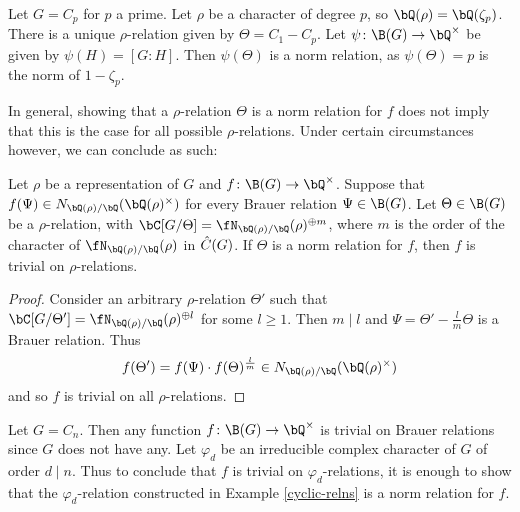 \begin{example}
    Let $G = C_p$ for $p$ a prime. Let $\rho$ be a character of degree $p$, so $\bQ(\rho) = \bQ(\zeta_p)$. There is a unique $\rho$-relation given by $\Theta = C_1 - C_p$. Let $\psi \colon \B(G) \to \bQ^{\times}$ be given by $\psi(H) = [G \colon H]$. Then $\psi(\Theta)$ is a norm relation, as $\psi(\Theta) = p$ is the norm of $1 - \zeta_p$.
\end{example}

In general, showing that a $\rho$-relation $\Theta$ is a norm relation for $f$ does not imply that this is the case for all possible $\rho$-relations. Under certain circumstances however, we can conclude as such:

\begin{prop}\label{min-to-all}
    Let $\rho$ be a representation of $G$ and $f \colon \B(G) \to \bQ^{\times}$. Suppose that $f(\Psi) \in \fieldnorm{\rho}$ for every Brauer relation $\Psi \in \B(G)$. 
    Let $\Theta \in \B(G)$ be a $\rho$-relation, with $\bC[G / \Theta] = \repnorm{\rho}^{\oplus m}$, where $m$ is the order of the character of $\repnorm{\rho}$ in $\hat{C}(G)$. 
    If $\Theta$ is a norm relation for $f$, then $f$ is trivial on $\rho$-relations. 
\end{prop}

\begin{proof}
    Consider an arbitrary $\rho$-relation $\Theta'$ such that $\bC[G / \Theta'] = \repnorm{\rho}^{\oplus l}$ for some $l \geq 1$. Then $m \mid l$ and $\Psi = \Theta' - \frac{l}{m}\Theta$ is a Brauer relation. Thus
    \[ f(\Theta') = f(\Psi)\cdot f(\Theta)^{\frac{l}{m}} \in \fieldnorm{\rho} \]
    and so $f$ is trivial on all $\rho$-relations.
\end{proof}

\begin{example}
    Let $G = C_n$. Then any function $f \colon \B(G) \to \bQ^{\times}$ is trivial on Brauer relations since $G$ does not have any. Let $\varphi_d$ be an irreducible complex character of $G$ of order $d \mid n$. Thus to conclude that $f$ is trivial on $\varphi_d$-relations, it is enough to show that the $\varphi_d$-relation constructed in Example \ref{cyclic-relns} is a norm relation for $f$.
\end{example}


